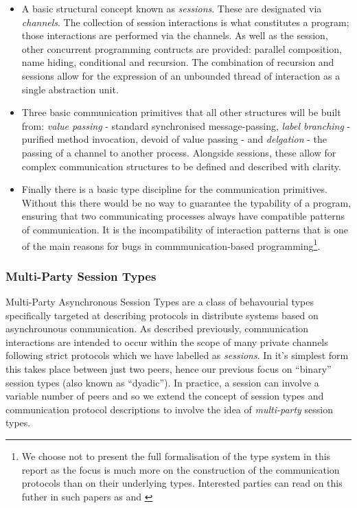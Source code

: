 \documentclass[11pt, abstracton, twoside, titlepage=true]{scrartcl}
\begin{document}
\begin{itemize}
	\item A basic structural concept known as \emph{sessions}. These are designated 
	via \emph{channels}. The collection of session interactions is what constitutes a 
	program; those interactions are performed via the channels. As well as the 
	session, other concurrent programming contructs are provided: parallel 
	composition, name hiding, conditional and recursion. The combination of 
	recursion and sessions allow for the expression of an unbounded thread of 
	interaction as a single abstraction unit.

	\item Three basic communication primitives that all other structures will be 
	built from: \emph{value passing} - standard synchronised message-passing, 
	\emph{label branching} - purified method invocation, devoid of value passing - and 
	\emph{delgation} - the passing of a channel to another process. Alongside 
	sessions, these allow for complex communication structures to be defined and 
	described with clarity.

	\item Finally there is a basic type discipline for the communication primitives. 
	Without this there would be no way to guarantee the typability of a program, 
	ensuring that two communicating processes always have compatible patterns of 
	communication. It is the incompatibility of interaction patterns that is one 
	of the main reasons for bugs in commmunication-based programming\footnote{We choose not to present the full formalisation of the type system 
	in this report as the focus is much more on the construction of the 
	communication protocols than on their underlying types. Interested parties can 
	read on this futher in such papers as \cite{HVM98} and \cite{HYC08}}.
\end{itemize}

\subsubsection{Multi-Party Session Types}
Multi-Party Asynchronous Session Types are a class of behavourial types
specifically targeted at describing protocols in distribute systems
based on asynchrounous communication\cite{CCPY15}. As described previously,
communication interactions are intended to occur within the scope of many
private channels following strict protocols which we have labelled as
\emph{sessions}. In it's simplest form this takes place between just two
peers, hence our previous focus on ``binary'' session types (also known as
``dyadic''). In practice, a session can involve a variable number of peers
and so we extend the concept of session types and communication protocol
descriptions to involve the idea of \emph{multi-party} session types.
\end{document}

